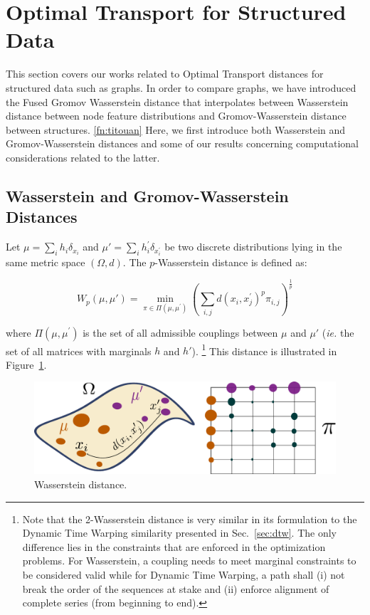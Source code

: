 \section{Optimal Transport for Structured Data}
\label{sec:ot}

This section covers our works related to Optimal Transport distances for
structured data such as graphs.
In order to compare graphs, we have introduced the Fused Gromov Wasserstein
distance that interpolates between Wasserstein distance between node feature
distributions and Gromov-Wasserstein distance between structures.%
\cref{fn:titouan}
Here, we first introduce both Wasserstein and Gromov-Wasserstein distances and
some of our results concerning computational considerations related to the
latter.

\subsection{Wasserstein and Gromov-Wasserstein Distances}

Let $\mu = \sum_i h_i \delta_{x_i}$ and $\mu' = \sum_i h^\prime_i \delta_{x^\prime_i}$
be two
discrete distributions lying in the same metric space $(\Omega, d)$.
The $p$-Wasserstein distance is defined as:

\begin{equation}
    W_p(\mu, \mu') = \min_{\pi \in \Pi(\mu, \mu^\prime)}
        \left(\sum_{i,j} d(x_i, x^\prime_j)^p \pi_{i,j} \right)^{\frac{1}{p}}
    \label{eq:wass}
\end{equation}

where $\Pi(\mu, \mu^\prime)$ is the set of all admissible couplings between
$\mu$ and $\mu'$ (\emph{ie.} the set of all matrices with marginals $h$ and $h'$).%
\footnote{Note that the 2-Wasserstein distance is very similar in its formulation to
the Dynamic Time Warping similarity presented in Sec.~\ref{sec:dtw}.
The only difference lies in the constraints that are enforced in the
optimization problems.
For Wasserstein, a coupling needs to meet marginal constraints to be considered
valid while for Dynamic Time Warping, a path shall (i) not break the order of
the sequences at stake and (ii) enforce alignment of complete series (from
beginning to end).}
This distance is illustrated in Figure~\ref{fig:wass}.

\begin{figure}
\centering
\includegraphics[width=.6\textwidth]{fig/wass}
\caption{Wasserstein distance. \label{fig:wass}}
\end{figure}

